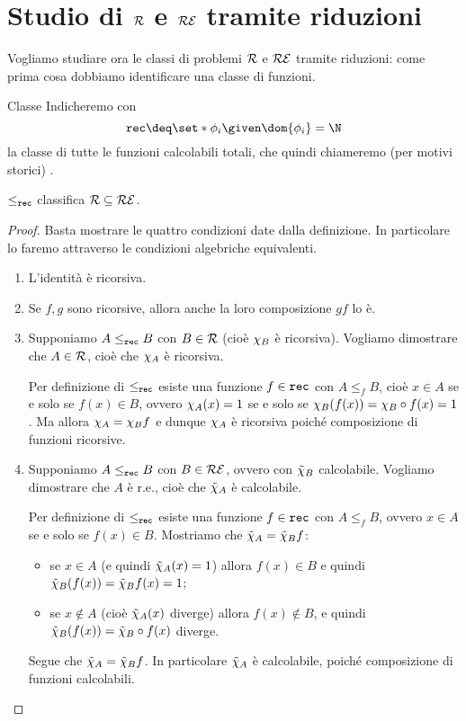 \section{Studio di \texorpdfstring{$\mathcal{R}$ e $\mathcal{RE}$}{R e RE} tramite riduzioni}

Vogliamo studiare ora le classi di problemi $\mathcal{R}$ e $\mathcal{RE}$ tramite riduzioni: come prima cosa dobbiamo identificare una classe di funzioni. 

\begin{definition}
    {Classe \rec}{}
    Indicheremo con \[
        \rec \deq \set*{\phi_i \given \dom{\phi_i} = \N}
    \] la classe di tutte le funzioni calcolabili totali, che quindi chiameremo (per motivi storici) .
\end{definition}

\begin{proposition}
    {}{}
    $\leq_{\texttt{rec}}$ classifica $\mathcal{R} \subseteq \mathcal{RE}$. 
\end{proposition}
\begin{proof}
    Basta mostrare le quattro condizioni date dalla definizione. In particolare lo faremo attraverso le condizioni algebriche equivalenti.
    \begin{enumerate}
        \item L'identità è ricorsiva.
        \item Se $f, g$ sono ricorsive, allora anche la loro composizione $gf$ lo è.
        \item Supponiamo $A \leq_{\texttt{rec}} B$ con $B \in \mathcal{R}$ (cioè $\chi_{B}$ è ricorsiva). Vogliamo dimostrare che $A \in \mathcal{R}$, cioè che $\chi_{A}$ è ricorsiva.
        
        Per definizione di $\leq_{\texttt{rec}}$ esiste una funzione $f \in \texttt{rec}$ con $A \leq_f B$, cioè $x \in A$ se e solo se $f(x) \in B$, ovvero $\chi_{A}(x) = 1$ se e solo se $\chi_{B}(f(x)) = \chi_{B} \circ f(x) = 1$. Ma allora $\chi_{A} = \chi_{B}f$ e dunque $\chi_{A}$ è ricorsiva poiché composizione di funzioni ricorsive.
        \item Supponiamo $A \leq_{\texttt{rec}} B$ con $B \in \mathcal{RE}$, ovvero con $\tilde{\chi}_{B}$ calcolabile. Vogliamo dimostrare che $A$ è r.e., cioè che $\tilde{\chi}_{A}$ è calcolabile.
        
        Per definizione di $\leq_{\texttt{rec}}$ esiste una funzione $f \in \texttt{rec}$ con $A \leq_f B$, ovvero $x \in A$ se e solo se $f(x) \in B$.
        Mostriamo che $\tilde{\chi}_{A} = \tilde{\chi}_{B}f$:
        \begin{itemize}
            \item se $x \in A$ (e quindi $\tilde{\chi}_{A}(x) = 1$) allora $f(x) \in B$ e quindi $\tilde{\chi}_{B}(f(x)) = \tilde{\chi}_{B}f(x) = 1$;
            \item se $x \notin A$ (cioè $\tilde{\chi}_{A}(x)$ diverge) allora $f(x) \notin B$, e quindi $\tilde{\chi}_{B}(f(x)) = \tilde{\chi}_{B} \circ f(x)$ diverge.
        \end{itemize}
        
        Segue che $\tilde{\chi}_{A} = \tilde{\chi}_{B}f$. In particolare $\tilde{\chi}_{A}$ è calcolabile, poiché composizione di funzioni calcolabili.  \qedhere
    \end{enumerate}
\end{proof}

